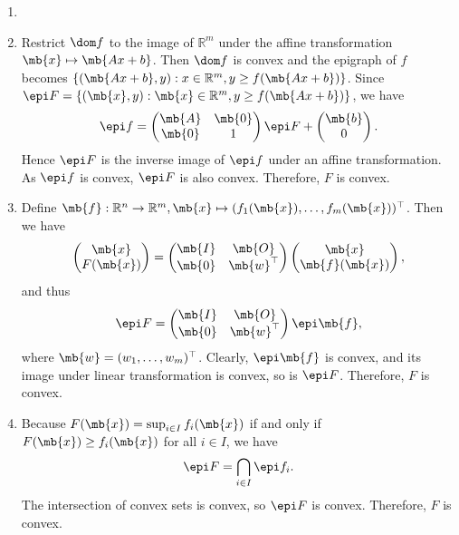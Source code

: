 \begin{exercise}
\begin{enumerate}
      \begin{solution}
        \begin{enumerate}
          \item []
          \item Restrict $\dom f$ to the image of $\mathbb{R}^m$ under the affine transformation $\mb{x} \mapsto \mb{Ax+b}$. Then $\dom f$ is convex and the epigraph of $f$ becomes $\{(\mb{Ax+b},y):x\in\mathbb{R}^m, y \ge f(\mb{Ax+b})\}$.
            Since $\epi F = \{(\mb{x},y): \mb{x}\in\mathbb{R}^m, y \ge f(\mb{Ax+b})\}$, we have
            $$
              \epi f = \begin{pmatrix}
                \mb{A} & \mb{0} \\
                \mb{0} & 1
              \end{pmatrix}\epi F + \begin{pmatrix}
                \mb{b} \\
                0
              \end{pmatrix}. 
            $$
            Hence $\epi F$ is the inverse image of $\epi f$ under an affine transformation. As $\epi f$ is convex, $\epi F$ is also convex. Therefore, $F$ is convex.
          \item Define $\mb{f}: \mathbb{R}^n \to \mathbb{R}^m, \mb{x} \mapsto (f_1(\mb{x}),\dots,f_m(\mb{x}))^\top$. Then we have
            $$
              \begin{pmatrix}
                \mb{x} \\
                F(\mb{x})
              \end{pmatrix} = \begin{pmatrix}
                \mb{I} & \mb{O}       \\
                \mb{0} & \mb{w}^\top
              \end{pmatrix}\begin{pmatrix}
                \mb{x} \\
                \mb{f}(\mb{x})
              \end{pmatrix},
            $$
            and thus
            $$
              \epi F = \begin{pmatrix}
                \mb{I} & \mb{O}       \\
                \mb{0} & \mb{w}^\top
              \end{pmatrix}\epi\mb{f},
            $$
            where $\mb{w} = (w_1,\dots,w_m)^\top$. Clearly, $\epi\mb{f}$ is convex, and its image under linear transformation is convex, so is $\epi F$. Therefore, $F$ is convex.
          \item Because $F(\mb{x}) = \sup_{i\in I}f_i(\mb{x})$ if and only if $F(\mb{x}) \ge f_i(\mb{x})$ for all $i \in I$, we have
            $$
              \epi F = \bigcap_{i\in I}\epi f_i.
            $$
            The intersection of convex sets is convex, so $\epi F$ is convex. Therefore, $F$ is convex.
            \qedhere
        \end{enumerate}
      \end{solution}
      

\end{enumerate}
\end{exercise}
